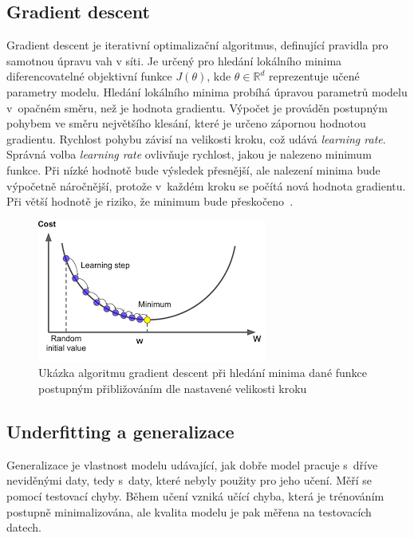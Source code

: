 \subsection*{Gradient descent}
Gradient descent je iterativní optimalizační algoritmus, definující pravidla pro samotnou úpravu vah v síti. Je určený pro hledání lokálního minima diferencovatelné objektivní funkce $J(\theta)$, kde $\theta \in \mathbb{R}^d$ reprezentuje učené parametry modelu. Hledání lokálního minima probíhá úpravou parametrů modelu v~opačném směru, než je hodnota gradientu. Výpočet je prováděn postupným pohybem ve směru největšího klesání, které je určeno zápornou hodnotou gradientu. Rychlost pohybu závisí na velikosti kroku, což udává \textit{learning rate}. Správná volba \textit{learning rate} ovlivňuje rychlost, jakou je nalezeno minimum funkce. Při nízké hodnotě bude výsledek přesnější, ale nalezení minima bude výpočetně náročnější, protože v~každém kroku se počítá nová hodnota gradientu. Při větší hodnotě je riziko, že minimum bude přeskočeno~\cite{ruder2016overview}.
\begin{figure}[H]
    \centering
    \includegraphics[scale=0.7]{obrazky-figures/gradientdescent.png}
    \caption{\label{fig:gradientdescent}Ukázka algoritmu gradient descent při hledání minima dané funkce postupným přibližováním dle nastavené velikosti kroku}
\end{figure}



\subsection{Underfitting a generalizace}
Generalizace je vlastnost modelu udávající, jak dobře model pracuje s~dříve neviděnými daty, tedy s~daty, které nebyly použity pro jeho učení. Měří se pomocí testovací chyby. Během učení vzniká učící chyba, která je trénováním postupně minimalizována, ale kvalita modelu je pak měřena na testovacích datech. 

